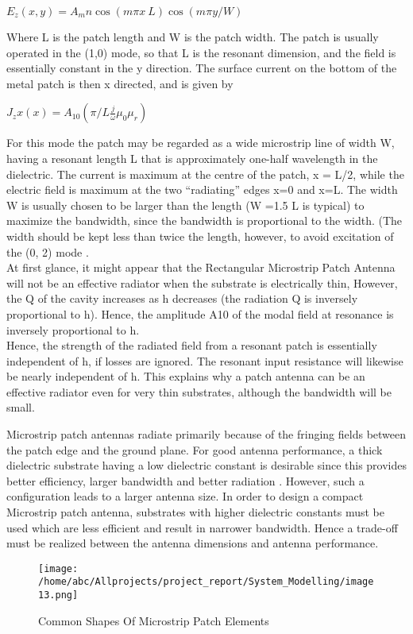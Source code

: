 	         \centering
             $ E_z(x, y) = A_mn \cos(m \pi x \ L) \cos(m \pi y / W) $
			
		\justify
           Where L is the patch length and W is the patch width. The patch is usually operated in the (1,0) mode,  so  that  L  is  the  resonant  dimension,  and  the  field  is  essentially  constant  in  the y direction. The surface current on the bottom of the metal patch is then x directed, and is given by
            
            \centering
             $ J_zx(x) = A_10(\pi / L \frac j \omega \mu_0 \mu_r) $

		  \justify
           For  this  mode  the  patch  may  be  regarded  as  a  wide  microstrip  line  of  width  W,  having  a resonant  length  L  that  is  approximately  one-half  wavelength  in  the  dielectric.  The  current  is maximum  at  the  centre  of  the  patch,  x  =  L/2,  while  the  electric  field  is  maximum  at  the  two “radiating” edges x=0 and x=L. The width W is usually chosen to be larger than the length (W =1.5 L is typical) to maximize the bandwidth, since the bandwidth is proportional to the width. (The width should be kept less than twice the length, however, to avoid excitation of the (0, 2) mode .
           \\
           At first glance, it might appear that the Rectangular Microstrip Patch Antenna will not be an effective radiator when the substrate is electrically thin,   However, the Q of the cavity increases as  h decreases (the radiation Q is inversely proportional to h). Hence, the amplitude A10  of the modal field  at  resonance  is  inversely  proportional  to  h.
           \\

           Hence,  the  strength  of  the  radiated  field  from  a resonant patch is  essentially independent  of  h,  if  losses are ignored. The resonant input resistance will  likewise  be  nearly  independent  of  h.  This  explains  why  a  patch  antenna  can  be  an  effective radiator even for very thin substrates, although the bandwidth will be small.
           
           Microstrip patch antennas radiate primarily because of the fringing fields between the patch edge and the ground plane. For good antenna performance, a thick dielectric substrate having a low dielectric constant is desirable since this provides better efficiency, larger bandwidth and better radiation . However, such a configuration leads to a larger antenna size. In order to design a compact Microstrip patch antenna, substrates with higher dielectric constants must be used which are less efficient and result in narrower bandwidth. Hence a trade-off must be realized between the antenna dimensions and antenna performance.

          \begin{figure}[H]
          	\centering
          	\texttt{[image: /home/abc/Allprojects/project\_report/System\_Modelling/image13.png]}
          	\caption{Common Shapes Of Microstrip Patch Elements}
          \end{figure}

           

          \cleardoublepage
